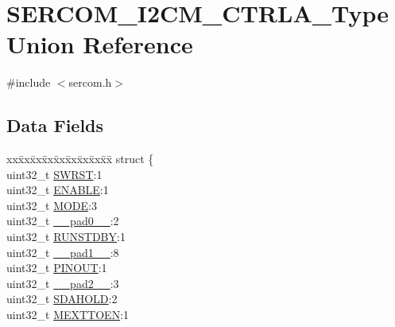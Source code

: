 \hypertarget{union_s_e_r_c_o_m___i2_c_m___c_t_r_l_a___type}{}\section{S\+E\+R\+C\+O\+M\+\_\+\+I2\+C\+M\+\_\+\+C\+T\+R\+L\+A\+\_\+\+Type Union Reference}
\label{union_s_e_r_c_o_m___i2_c_m___c_t_r_l_a___type}


{\ttfamily \#include $<$sercom.\+h$>$}

\subsection*{Data Fields}
\begin{DoxyCompactItemize}
\item 
\begin{tabbing}
xx\=xx\=xx\=xx\=xx\=xx\=xx\=xx\=xx\=\kill
struct \{\\
\>uint32\_t \mbox{\hyperlink{union_s_e_r_c_o_m___i2_c_m___c_t_r_l_a___type_a34cd956a8da179cbd5fc9060306d420e}{SWRST}}:1\\
\>uint32\_t \mbox{\hyperlink{union_s_e_r_c_o_m___i2_c_m___c_t_r_l_a___type_a66f979832c85e0692bd9422b05aff1f7}{ENABLE}}:1\\
\>uint32\_t \mbox{\hyperlink{union_s_e_r_c_o_m___i2_c_m___c_t_r_l_a___type_aad9612db6a93afb1482213d2d36f1c5e}{MODE}}:3\\
\>uint32\_t \mbox{\hyperlink{union_s_e_r_c_o_m___i2_c_m___c_t_r_l_a___type_a3e57c2ef1c3ffb36722f000cc1156824}{\_\_pad0\_\_}}:2\\
\>uint32\_t \mbox{\hyperlink{union_s_e_r_c_o_m___i2_c_m___c_t_r_l_a___type_a5656560aef3eaf5aac89b68b9fe39c3a}{RUNSTDBY}}:1\\
\>uint32\_t \mbox{\hyperlink{union_s_e_r_c_o_m___i2_c_m___c_t_r_l_a___type_a6712ba6dd1d5b43d2d56ff8ac4e275a7}{\_\_pad1\_\_}}:8\\
\>uint32\_t \mbox{\hyperlink{union_s_e_r_c_o_m___i2_c_m___c_t_r_l_a___type_af34043eac13028b9bd17d4ac6432b1b4}{PINOUT}}:1\\
\>uint32\_t \mbox{\hyperlink{union_s_e_r_c_o_m___i2_c_m___c_t_r_l_a___type_a9ce12a63de64ef64ae2d59d128251cae}{\_\_pad2\_\_}}:3\\
\>uint32\_t \mbox{\hyperlink{union_s_e_r_c_o_m___i2_c_m___c_t_r_l_a___type_acdfc2515046dc3a3c412b210176bbc3c}{SDAHOLD}}:2\\
\>uint32\_t \mbox{\hyperlink{union_s_e_r_c_o_m___i2_c_m___c_t_r_l_a___type_a9cbb9e51691d6894a26243184b490578}{MEXTTOEN}}:1\\

\end{tabbing}
\end{DoxyCompactItemize}
